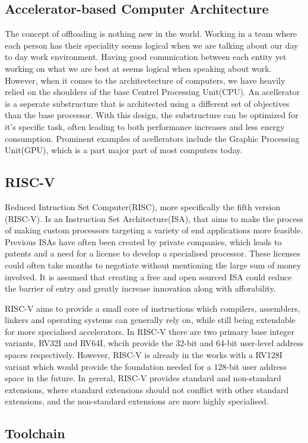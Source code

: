 
\subsection{Accelerator-based Computer Architecture}
The concept of offloading is nothing new in the world.
Working in a team where each person has their speciality seems logical when we are talking about our day to day work environment.
Having good comunication between each entity yet working on what we are best at seems logical when speaking about work. However,
when it comes to the architectecture of computers, we have heavily relied on the shoulders of the base Centrel Processing Unit(CPU).
An acellerator is a seperate substructure that is architected using a different set of objectives
than the base processor. With this design, the substructure can be optimized for it's specific task, often leading to both performance increases
and less energy consumption. \cite{AA} Prominent examples of acellerators include the Graphic Processing Unit(GPU), which is a part major part of most computers today.

\subsection{RISC-V}
Reduced Intruction Set Computer(RISC), more specifically the fifth version (RISC-V). Is an Instruction Set Architecture(ISA), that aims to make the process of
making custom processors targeting a variety of end applications more feasible. Previous ISAs have often been created by private companies, which leads to patents
and a need for a license to develop a specialised processor. These licenses could often take months to negotiate without mentioning the large sum of money involved.
It is assumed that creating a free and open sourced ISA could reduce the barrier of entry and greatly increase innovation along with afforability.\cite{ISAfree}

RISC-V aims to provide a small core of instructions which compilers, assemblers, linkers and operating systems can generally rely on, while still being extendable for more specialised
accelerators. In RISC-V there  are two primary base integer variants, RV32I and RV64I, whcih provide the 32-bit and 64-bit user-level address spaces respectively. However, RISC-V is already
in the works with a RV128I variant which would provide the foundation needed for a 128-bit user address space in the future. In gereral, RISC-V provides standard and non-standard extensions,
where standard extensions should not conflict with other standard extensions, and the non-standard extensions are more highly specialised.


\subsection{Toolchain}

